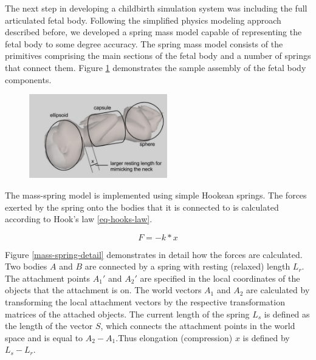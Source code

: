 The next step in developing a childbirth simulation system was including the full articulated fetal body.
Following the simplified physics modeling approach described before, we developed a spring mass model capable of representing the fetal body to some degree accuracy. The spring mass model consists of the primitives comprising the main sections of the fetal body and a number of springs that connect them. Figure \ref{full-articulated} demonstrates the sample assembly of the fetal body components.

\begin{figure}
  \centering
    \includegraphics[width=60mm]{sections/methodology/images/basic/full-articulated.png}
  \caption[The simplified articulated mass-spring fetal body model]{\label{full-articulated}}
\end{figure}

The mass-spring model is implemented using simple Hookean springs. The forces exerted by the spring onto the bodies that it is connected to is calculated according to Hook's law \ref{eq-hooks-law}.


\begin{equation}
\label{eq-hooks-law}
F = - k * x
\end{equation}

Figure \ref{mass-spring-detail} demonstrates in detail how the forces are calculated. Two bodies $A$ and $B$ are connected by a spring with resting (relaxed) length $L_r$. The attachment points $A_1'$ and $A_2'$ are specified in the local coordinates of the objects that the attachment is on. The world vectors $A_1$ and $A_2$ are calculated by transforming the local attachment vectors by the respective transformation matrices of the attached objects. The current length of the spring $L_s$ is defined as the length of the vector $S$, which connects the attachment points in the world space and is equal to $A_2-A_1$.Thus elongation (compression) $x$ is defined by $L_s-L_r$.

